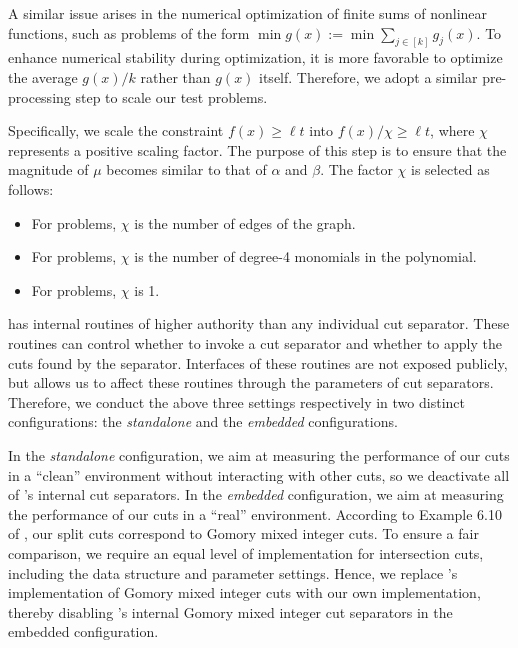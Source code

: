 A similar issue arises in the numerical optimization of finite sums of nonlinear functions, such as problems of the form $\min g(x):= \min \sum_{j \in [k]} g_j(x)$. To enhance numerical stability during optimization, it is more favorable to optimize the average $g(x)/k$ rather than $g(x)$ itself. Therefore, we adopt a similar pre-processing step to scale our test problems.

Specifically, we scale the constraint $f(x) \geq \ell t$ into $f(x) / \chi \geq \ell t$, where $\chi$ represents a positive scaling factor. The purpose of this step is to ensure that the magnitude of $\mu$ becomes similar to that of $\alpha$ and $\beta$. The factor $\chi$ is selected as follows:

\begin{itemize}
    \item For \maxcut problems, $\chi$ is the number of edges of the graph.
    \item For \pbm problems, $\chi$ is the number of  degree-4 monomials in the polynomial.
    \item For \dopt problems, $\chi$ is 1.
\end{itemize}


 \scip has internal routines of higher authority than any individual cut separator. These routines  can control whether to invoke a cut separator and whether to apply the cuts found by the separator. Interfaces of these routines are not exposed publicly, but  \scip  allows us to affect these routines through the parameters of cut separators.  Therefore, we conduct the above three settings
 respectively in two distinct  configurations: the \textit{standalone}  and the \textit{embedded} configurations. 
 
 In the \textit{standalone}  configuration, we aim at measuring the  performance of our cuts in a ``clean'' environment without interacting with other cuts, so we deactivate all of \scip's internal cut separators.  In the \textit{embedded} configuration, we aim at measuring the  performance of our cuts in a ``real'' environment. According to Example 6.10 of \cite{conforti2014integer}, our split cuts correspond to Gomory mixed integer cuts.  To ensure a fair comparison, we require an equal level of implementation for intersection cuts, including the data structure and parameter settings. Hence, we replace \scip's implementation of Gomory mixed integer cuts with our own implementation, thereby disabling \scip's internal Gomory mixed integer cut separators in the embedded configuration.

